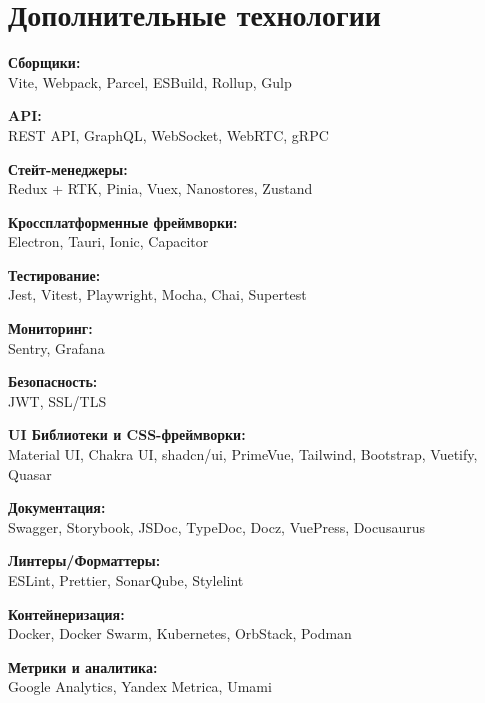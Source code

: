 \documentclass[a4paper,12pt]{article}
\newcommand{\SkillGroup}[2]{%
  \RaggedRight
  \textbf{#1:}\\ #2\\
  \vspace*{0.4em}
}
\newenvironment{nohyphens}{%
  \begingroup\hyphenpenalty=10000\exhyphenpenalty=10000\sloppy
}{%
  \endgroup
}
\begin{document}
\section*{Дополнительные технологии}
\begin{nohyphens}
  \SkillGroup{Сборщики}{Vite, Webpack, Parcel, ESBuild, Rollup, Gulp}

  \SkillGroup{API}{REST API, GraphQL, WebSocket, WebRTC, gRPC}

  \SkillGroup{Стейт-менеджеры}{Redux + RTK, Pinia, Vuex, Nanostores, Zustand}

  \SkillGroup{Кроссплатформенные фреймворки}{Electron, Tauri, Ionic, Capacitor}

  \SkillGroup{Тестирование}{Jest, Vitest, Playwright, Mocha, Chai, Supertest}

  \SkillGroup{Мониторинг}{Sentry, Grafana}

  \SkillGroup{Безопасность}{JWT, SSL/TLS}

  \SkillGroup{UI Библиотеки и CSS-фреймворки}{Material UI, Chakra UI, shadcn/ui, PrimeVue, Tailwind, Bootstrap, Vuetify, Quasar}

  \SkillGroup{Документация}{Swagger, Storybook, JSDoc, TypeDoc, Docz, VuePress, Docusaurus}

  \SkillGroup{Линтеры/Форматтеры}{ESLint, Prettier, SonarQube, Stylelint}

  \SkillGroup{Контейнеризация}{Docker, Docker Swarm, Kubernetes, OrbStack, Podman}

  \SkillGroup{Метрики и аналитика}{Google Analytics, Yandex Metrica, Umami}
\end{nohyphens}
\end{document}
